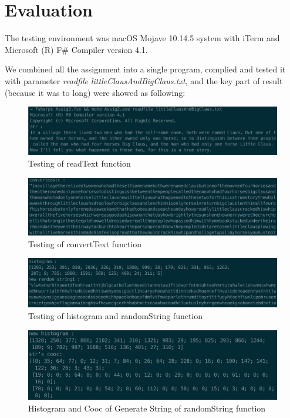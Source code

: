 \documentclass{article}
\begin{document}
\section{Evaluation}

The testing environment was macOS Mojave 10.14.5 system with iTerm and Microsoft (R) F\# Compiler version 4.1.

We combined all the assignment into a single program, complied and tested it with parameter \emph{readfile littleClausAndBigClaus.txt}, and the key part of result (because it was to long) were showed as following:

\begin{figure}[htbp]
      \centering
      \includegraphics[width=\linewidth]{inputandread}
      \caption{Testing of readText function}
      \label{fig:inputandread}
\end{figure}

\begin{figure}[htbp]
      \centering
      \includegraphics[width=\linewidth]{convert}
      \caption{Testing of convertText function}
      \label{fig:convert}
\end{figure}

\begin{figure}[htbp]
      \centering
      \includegraphics[width=\linewidth]{histogramandnewstring1}
      \caption{Testing of histogram and randomString function}
      \label{fig:histogramandnewstring1}
\end{figure}

\begin{figure}[htbp]
      \centering
      \includegraphics[width=\linewidth]{newhistogram1andoldcooc}
      \caption{Histogram and Cooc of Generate String of randomString function}
      \label{fig:newhistogram1andoldcooc}
\end{figure}
\end{document}
